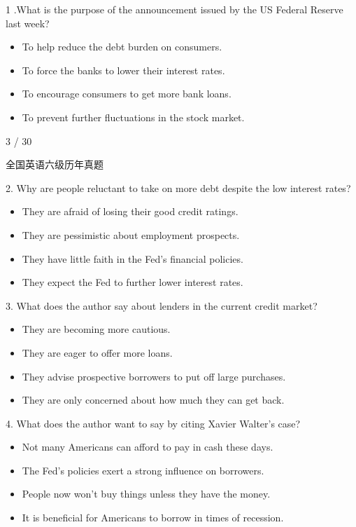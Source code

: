 \documentclass[UTF8,11pt]{ctexart}
\begin{document}
1 .What is the purpose of the announcement issued by the US Federal Reserve last week?


\begin{itemize}[leftmargin=2em,itemsep=.2em,topsep=.4em]\item[A.] To help reduce the debt burden on consumers.
\item[B.] To force the banks to lower their interest rates.
\item[C.] To encourage consumers to get more bank loans.
\item[D.] To prevent further fluctuations in the stock market.
\end{itemize}

3 / 30


全国英语六级历年真题


2. Why are people reluctant to take on more debt despite the low interest rates?


\begin{itemize}[leftmargin=2em,itemsep=.2em,topsep=.4em]\item[A.] They are afraid of losing their good credit ratings.
\item[B.] They are pessimistic about employment prospects.
\item[C.] They have little faith in the Fed's financial policies.
\item[D.] They expect the Fed to further lower interest rates.
\end{itemize}

3. What does the author say about lenders in the current credit market?


\begin{itemize}[leftmargin=2em,itemsep=.2em,topsep=.4em]\item[A.] They are becoming more cautious.
\item[B.] They are eager to offer more loans.
\item[C.] They advise prospective borrowers to put off large purchases.
\item[D.] They are only concerned about how much they can get back.
\end{itemize}

4. What does the author want to say by citing Xavier Walter's case?


\begin{itemize}[leftmargin=2em,itemsep=.2em,topsep=.4em]\item[A.] Not many Americans can afford to pay in cash these days.
\item[B.] The Fed's policies exert a strong influence on borrowers.
\item[C.] People now won't buy things unless they have the money.
\item[D.] It is beneficial for Americans to borrow in times of recession.
\end{itemize}
\end{document}
